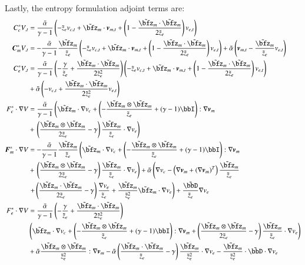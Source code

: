 \documentclass[preprint,12pt]{elsarticle}
\begin{document}
Lastly, the entropy formulation adjoint terms are:
\begin{align*}
C^*_cV_{,t}&=
\frac{\tilde\alpha}{\gamma-1}\LRp{-\tilde z_e v_{c,t}+\tilde\bfz_m\cdot\bfv_{m,t}
+\LRp{1-\frac{\tilde\bfz_m\cdot\tilde\bfz_m}{2\tilde z_e}}v_{e,t}}
\\
\bfC^*_mV_{,t}&=
-\frac{\tilde\alpha}{\gamma-1}\frac{\tilde\bfz_m}{\tilde z_e}\LRp{-\tilde z_e v_{c,t}+\tilde\bfz_m\cdot\bfv_{m,t}
+\LRp{1-\frac{\tilde\bfz_m\cdot\tilde\bfz_m}{2\tilde z_e}}v_{e,t}}
+\tilde\alpha\LRp{\bfv_{m,t}-\frac{\tilde\bfz_m}{\tilde z_e}v_{e,t}}
\\
C^*_eV_{,t}&=
\frac{\tilde\alpha}{\gamma-1}\LRp{-\frac{\gamma}{\tilde z_e}
+\frac{\tilde\bfz_m\cdot\tilde\bfz_m}{2\tilde z_e^2}}
\LRp{-\tilde z_e v_{c,t}+\tilde\bfz_m\cdot\bfv_{m,t}
+\LRp{1-\frac{\tilde\bfz_m\cdot\tilde\bfz_m}{2\tilde z_e}}v_{e,t}}\\
&+\tilde\alpha\LRp{-v_{c,t}+\frac{\tilde\bfz_m\cdot\tilde\bfz_m}{2\tilde z_e^2} v_{e,t}}
\\
%
F^*_c\cdot\Grad V&=\frac{\tilde\alpha}{\gamma-1}\left(
\tilde\bfz_m\cdot\Grad v_c
+\LRp{-\frac{\tilde\bfz_m\otimes\tilde\bfz_m}{\tilde z_e}+(\gamma-1)\bbI}:\Grad\bfv_m\right.\\
&+\left.
\LRp{\frac{\tilde\bfz_m\otimes\tilde\bfz_m}{2\tilde z_e}-\gamma}\frac{\tilde\bfz_m}{\tilde z_e}\cdot\Grad v_e
\right)
\\
\bfF^*_m\cdot\Grad V&=-\frac{\tilde\alpha}{\gamma-1}\frac{\tilde\bfz_m}{\tilde z_e}\left(
\tilde\bfz_m\cdot\Grad v_c
+\LRp{-\frac{\tilde\bfz_m\otimes\tilde\bfz_m}{\tilde z_e}+(\gamma-1)\bbI}:\Grad\bfv_m
\right.\\
&+\left.
\LRp{\frac{\tilde\bfz_m\otimes\tilde\bfz_m}{2\tilde z_e}-\gamma}\frac{\tilde\bfz_m}{\tilde z_e}\cdot\Grad v_e
\right)
+\tilde\alpha\left(\Grad v_c
-\LRp{\Grad\bfv_m+(\Grad\bfv_m)^T}\frac{\tilde\bfz_m}{\tilde z_e}\right.\\
&\left.+\LRp{\frac{\tilde\bfz_m\cdot\tilde\bfz_m}{2\tilde z_e}-\gamma}\frac{\Grad v_e}{\tilde z_e}
+\frac{\tilde\bfz_m}{\tilde z_e^2}\tilde\bfz_m\cdot\Grad v_e\right)
+\frac{\tilde\bbD}{\tilde z_e}\Grad v_e
\\
F^*_e\cdot\Grad V&=
\frac{\tilde\alpha}{\gamma-1}\LRp{-\frac{\gamma}{\tilde z_e}
+\frac{\tilde\bfz_m\cdot\tilde\bfz_m}{2\tilde z_e^2}}\\
&\LRp{
\tilde\bfz_m\cdot\Grad v_c
+\LRp{-\frac{\tilde\bfz_m\otimes\tilde\bfz_m}{\tilde z_e}+(\gamma-1)\bbI}:\Grad\bfv_m
+
\LRp{\frac{\tilde\bfz_m\otimes\tilde\bfz_m}{2\tilde z_e}-\gamma}\frac{\tilde\bfz_m}{\tilde z_e}\cdot\Grad v_e
}\\
&+\tilde\alpha\frac{\tilde\bfz_m\otimes\tilde\bfz_m}{\tilde z_e^2}:\Grad\bfv_m
-\tilde\alpha\LRp{\frac{\tilde\bfz_m\cdot\tilde\bfz_m}{\tilde z_e}-\gamma}\frac{\tilde\bfz_m}{\tilde z_e^2}\cdot\Grad v_e
-\frac{\tilde\bfz_m}{\tilde z_e^2}\cdot\tilde\bbD\cdot\Grad v_e
\\
%
\end{align*}
\end{document}
